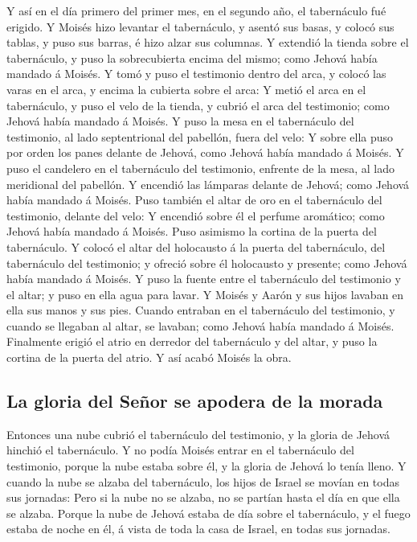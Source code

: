  Y así en el día primero del primer mes, en el segundo año,
el tabernáculo fué erigido.  Y Moisés hizo levantar el
tabernáculo, y asentó sus basas, y colocó sus tablas, y puso sus barras,
é hizo alzar sus columnas.  Y extendió la tienda sobre el
tabernáculo, y puso la sobrecubierta encima del mismo; como Jehová había
mandado á Moisés.  Y tomó y puso el testimonio dentro del
arca, y colocó las varas en el arca, y encima la cubierta sobre el arca:
 Y metió el arca en el tabernáculo, y puso el velo de la
tienda, y cubrió el arca del testimonio; como Jehová había mandado á
Moisés.  Y puso la mesa en el tabernáculo del testimonio,
al lado septentrional del pabellón, fuera del velo:  Y
sobre ella puso por orden los panes delante de Jehová, como Jehová había
mandado á Moisés.  Y puso el candelero en el tabernáculo
del testimonio, enfrente de la mesa, al lado meridional del pabellón.
 Y encendió las lámparas delante de Jehová; como Jehová
había mandado á Moisés.  Puso también el altar de oro en el
tabernáculo del testimonio, delante del velo:  Y encendió
sobre él el perfume aromático; como Jehová había mandado á Moisés.
 Puso asimismo la cortina de la puerta del tabernáculo.
 Y colocó el altar del holocausto á la puerta del
tabernáculo, del tabernáculo del testimonio; y ofreció sobre él
holocausto y presente; como Jehová había mandado á Moisés. 
Y puso la fuente entre el tabernáculo del testimonio y el altar; y puso
en ella agua para lavar.  Y Moisés y Aarón y sus hijos
lavaban en ella sus manos y sus pies.  Cuando entraban en
el tabernáculo del testimonio, y cuando se llegaban al altar, se
lavaban; como Jehová había mandado á Moisés.  Finalmente
erigió el atrio en derredor del tabernáculo y del altar, y puso la
cortina de la puerta del atrio. Y así acabó Moisés la obra.

\hypertarget{la-gloria-del-seuxf1or-se-apodera-de-la-morada}{%
\subsection{La gloria del Señor se apodera de la
morada}\label{la-gloria-del-seuxf1or-se-apodera-de-la-morada}}

 Entonces una nube cubrió el tabernáculo del testimonio, y
la gloria de Jehová hinchió el tabernáculo.  Y no podía
Moisés entrar en el tabernáculo del testimonio, porque la nube estaba
sobre él, y la gloria de Jehová lo tenía lleno.  Y cuando
la nube se alzaba del tabernáculo, los hijos de Israel se movían en
todas sus jornadas:  Pero si la nube no se alzaba, no se
partían hasta el día en que ella se alzaba.  Porque la nube
de Jehová estaba de día sobre el tabernáculo, y el fuego estaba de noche
en él, á vista de toda la casa de Israel, en todas sus jornadas.
